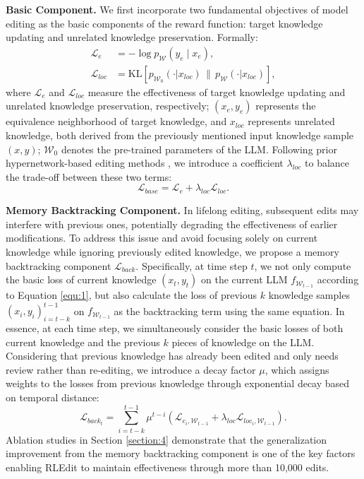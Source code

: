 \textbf{Basic Component.} We first incorporate two fundamental objectives of model editing as the basic components of the reward function: target knowledge updating and unrelated knowledge preservation. Formally:
\begin{equation}
\begin{aligned}
\mathcal{L}_{e} & =-\log p_\mathcal{W}\left(y_e \mid x_e \right), \\
\mathcal{L}_{\mathit{loc}} &=\mathrm{KL} \left[ p_{\mathcal{W}_0}(\cdot|x_{\mathit{loc}}) \, \|\, p_{\mathcal{W}}(\cdot|x_{\mathit{loc}}) \right],
\end{aligned}
\end{equation}
where $\mathcal{L}_e$ and $\mathcal{L}_{\mathit{loc}}$ measure the effectiveness of target knowledge updating and unrelated knowledge preservation, respectively; $(x_e,y_e)$ represents the equivalence neighborhood of target knowledge, and $x_{\mathit{loc}}$ represents unrelated knowledge, both derived from the previously mentioned input knowledge sample $(x,y)$; $\mathcal{W}_0$ denotes the pre-trained parameters of the LLM. Following prior hypernetwork-based editing methods \cite{mend, malmen, dafnet}, we introduce a coefficient $\lambda_{\mathit{loc}}$ to balance the trade-off between these two terms:
\begin{equation}
\mathcal{L}_{\mathit{base}}=\mathcal{L}_e+\lambda_{\mathit{loc}}\mathcal{L}_{\mathit{loc}}.
\label{equ:1}
\end{equation}

\textbf{Memory Backtracking Component.} In lifelong editing, subsequent edits may interfere with previous ones, potentially degrading the effectiveness of earlier modifications. To address this issue and avoid focusing solely on current knowledge while ignoring previously edited knowledge, we propose a memory backtracking component $\mathcal{L}_{back}$.  Specifically, at time step $t$, we not only compute the basic loss of current knowledge $(x_t,y_t)$ on the current LLM $f_{\mathcal{W}_{t-1}}$ according to Equation \ref{equ:1}, but also calculate the loss of previous $k$ knowledge samples $(x_i,y_i)_{i=t-k}^{t-1}$ on $f_{\mathcal{W}_{t-1}}$ as the backtracking term using the same equation. In essence, at each time step, we simultaneously consider the basic losses of both current knowledge and the previous $k$ pieces of knowledge on the LLM. Considering that previous knowledge has already  been edited and only needs review rather than re-editing, we introduce a decay factor $\mu$, which assigns weights to the losses from previous knowledge through exponential decay based on temporal distance:
\begin{equation}
\mathcal{L}_{\mathit{back}_t}=\sum_{i=t-k}^{t-1}{\mu^{t-i}\left(\mathcal{L}_{e_i,\mathcal{W}_{t-1}}+\lambda_{\mathit{loc}}\mathcal{L}_{\mathit{loc}_i,\mathcal{W}_{t-1}}\right)}.
\end{equation}
Ablation studies in Section \ref{section:4} demonstrate that the generalization improvement from the memory backtracking component is one of the key factors enabling RLEdit to maintain effectiveness through more than 10,000 edits.

